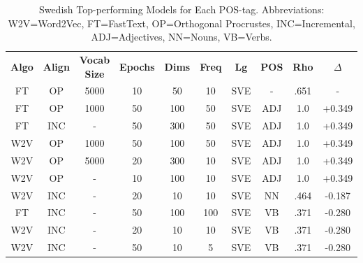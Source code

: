 \begin{table}[h]
\centering
\begin{tabular}{cccccccccc} 
\toprule
\textbf{ Algo } & \textbf{ Align } & \textbf{ Vocab Size } & \textbf{ Epochs } & \textbf{ Dims } & \textbf{ Freq } & \textbf{ Lg } & \textbf{ POS } & \textbf{ Rho } & \textbf{ $\Delta$ }  \\
FT              & OP               & 5000                  & 10                & 50              & 10                        & SVE           & -              & .651           & -               \\
FT              & OP               & 1000                  & 50                & 100             & 50                        & SVE           & ADJ            & 1.0            & +0.349          \\
FT              & INC              & -                     & 50                & 300             & 50                        & SVE           & ADJ            & 1.0            & +0.349          \\
W2V             & OP               & 1000                  & 50                & 100             & 50                        & SVE           & ADJ            & 1.0            & +0.349          \\
W2V             & OP               & 5000                  & 20                & 300             & 10                        & SVE           & ADJ            & 1.0            & +0.349          \\
W2V             & OP               & -                     & 10                & 100             & 10                        & SVE           & ADJ            & 1.0            & +0.349          \\
W2V             & INC              & -                     & 20                & 10              & 10                        & SVE           & NN             & .464           & -0.187          \\
FT              & INC              & -                     & 50                & 100             & 100                       & SVE           & VB             & .371           & -0.280          \\
W2V             & INC              & -                     & 20                & 10              & 10                        & SVE           & VB             & .371           & -0.280          \\
W2V             & INC              & -                     & 50                & 10              & 5                         & SVE           & VB             & .371           & -0.280          \\
\bottomrule
\end{tabular}
\caption{Swedish Top-performing Models for Each POS-tag. Abbreviations: W2V=Word2Vec, FT=FastText, OP=Orthogonal Procrustes, INC=Incremental, ADJ=Adjectives, NN=Nouns, VB=Verbs.}
\label{tab:sve-posresults}
\end{table}

